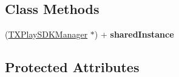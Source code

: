 \subsection*{Class Methods}
\begin{DoxyCompactItemize}
\item 
\hypertarget{interface_t_x_play_s_d_k_manager_ab8435d755afcc199b6ce3a3cbf132bed}{}(\hyperlink{interface_t_x_play_s_d_k_manager}{T\+X\+Play\+S\+D\+K\+Manager} $\ast$) + {\bfseries shared\+Instance}\label{interface_t_x_play_s_d_k_manager_ab8435d755afcc199b6ce3a3cbf132bed}

\end{DoxyCompactItemize}
\subsection*{Protected Attributes}
